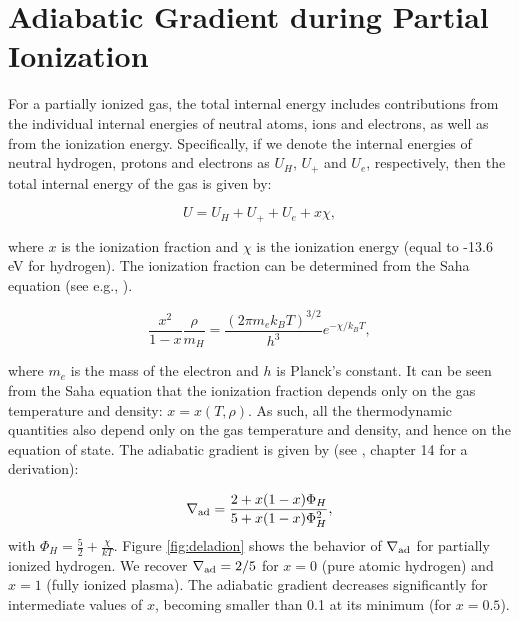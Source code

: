 \documentclass[apj]{emulateapj}
\newcommand{\delad}{\nabla_{\rm ad}}
\begin{document}
 







\section{Adiabatic Gradient during Partial Ionization}\label{deladioniz}

For a partially ionized gas, the total internal energy includes contributions from the individual internal energies of neutral atoms, ions and electrons, as well as from the ionization energy. Specifically, if we denote the internal energies of neutral hydrogen, protons and electrons as $U_{H}$, $U_+$ and $U_e$, respectively, then the total internal energy of the gas is given by:

\begin{equation}
U=U_H+U_+ + U_e + x \chi,
\end{equation}

\noindent where $x$ is the ionization fraction and $\chi$ is the ionization energy (equal to -13.6 eV for hydrogen). The ionization fraction can be determined from the Saha equation (see e.g., \citealt{kippenhahn90}).

\begin{equation}
\label{eq:saha}
\frac{x^2}{1-x} \frac{\rho}{m_H}=\frac{(2 \pi m_e k_B T)^{3/2}}{h^3} e^{-\chi/k_B T},
\end{equation}

\noindent where $m_e$ is the mass of the electron and $h$ is Planck's constant. It can be seen from the Saha equation that the ionization fraction depends only on the gas temperature and density: $x=x(T, \rho)$. As such, all the thermodynamic quantities also depend only on the gas temperature and density, and hence on the equation of state. The adiabatic gradient is given by (see \citealt{kippenhahn90}, chapter 14 for a derivation):

\begin{equation}
\delad=\frac{2+x (1-x) \Phi_H}{5+x (1-x) \Phi_H^2},
\end{equation} 
with $\Phi_H=\frac{5}{2}+\frac{\chi}{k T}$. Figure \ref{fig:deladion} shows the behavior of $\delad$ for partially ionized hydrogen. We recover $\delad=2/5$ for $x=0$ (pure atomic hydrogen) and $x=1$ (fully ionized plasma). The adiabatic gradient decreases significantly for intermediate values of $x$, becoming smaller than 0.1 at its minimum (for $x=0.5$). 
\end{document}
